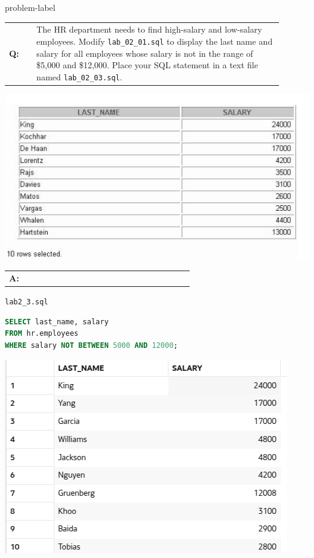 \begin{problem}{}{problem-label}

\begin{tabular}{@{}l p{0.9\linewidth}@{}}
  \textbf{Q:} & The HR department needs to find high-salary and low-salary employees. Modify \texttt{lab\_02\_01.sql} to display the last name and salary for all employees whose salary is not in
the range of \$5,000 and \$12,000. Place your SQL statement in a text file named \texttt{lab\_02\_03.sql}.
\end{tabular}

\begin{center}
  \includegraphics[scale=0.8]{images/c2q3.png}
\end{center}

\newpage

\begin{tabular}{@{}l p{0.9\linewidth}@{}}
  \textbf{A:} &
\end{tabular}

\hspace{1.5em}\texttt{lab2\_3.sql}
\begin{lstlisting}[language=SQL]
SELECT last_name, salary
FROM hr.employees
WHERE salary NOT BETWEEN 5000 AND 12000;
\end{lstlisting}

\vspace{1em}

\begin{center}
  \includegraphics[scale=0.8]{images/c2a3.png}
\end{center}

\end{problem}


